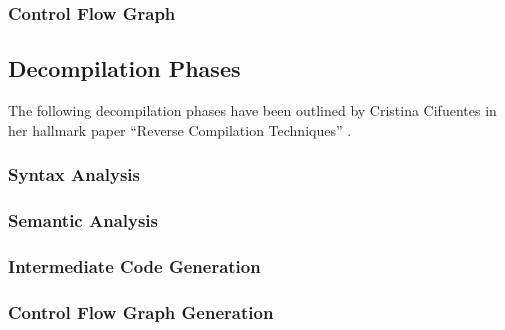 \documentclass[12pt, a4paper]{article}
\begin{document}
\cite{ssa_decomp}



\subsubsection{Control Flow Graph}


\subsection{Decompilation Phases}


The following decompilation phases have been outlined by Cristina Cifuentes in
her hallmark paper ``Reverse Compilation Techniques'' \cite{rev_comp}.


\subsubsection{Syntax Analysis}


\subsubsection{Semantic Analysis}


\subsubsection{Intermediate Code Generation}


\subsubsection{Control Flow Graph Generation}
\end{document}
